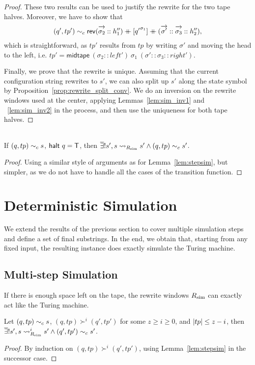 \begin{proof}
  These two results can be used to justify the rewrite for the two tape halves. Moreover, we have to show that 
  \begin{align*}
    (q', tp') \reprc{} \rev{(\polpos{\sigma_2} :: h_1'')} \concat [{q'}^{\sigma_1}] \concat (\polpos{\sigma'} :: \polpos{\sigma_3} :: h_2''), 
  \end{align*}
  which is straightforward, as $tp'$ results from $tp$ by writing $\sigma'$ and moving the head to the left, i.e.
    $tp' = \textsf{midtape}~(\sigma_2 :: left')~\sigma_1~(\sigma' :: \sigma_3 :: right')$.

  Finally, we prove that the rewrite is unique. Assuming that the current configuration string rewrites to $s'$, we can also split up $s'$ along the state symbol by Proposition~\ref{prop:rewrite_split_conv}. We do an inversion on the rewrite windows used at the center, applying Lemmas~\ref{lem:sim_inv1} and ~\ref{lem:sim_inv2} in the process, and then use the uniqueness for both tape halves.
\end{proof}

\begin{lemma}\label{lem:haltsim}~\\
  If $(q, tp) \sim_c{} s$, $\textsf{halt}~q = \mathsf{T}$, then $\overline{\exists}! s', s \rightsquigarrow_{R_{\text{sim}}} s' \land (q, tp) \sim_c{} s'$.
\end{lemma}
\begin{proof}
  Using a similar style of arguments as for Lemma~\ref{lem:stepsim}, but simpler, as we do not have to handle all the cases of the transition function.
\end{proof}

\section{Deterministic Simulation}
We extend the results of the previous section to cover multiple simulation steps and define a set of final substrings. In the end, we obtain that, starting from any fixed input, the resulting \PR{} instance does exactly simulate the Turing machine.

\subsection{Multi-step Simulation}
If there is enough space left on the tape, the rewrite windows $R_{\text{sim}}$ can exactly act like the Turing machine.

\begin{lemma}\label{lem:multistep_complete}
  Let $(q, tp) \sim_c{} s$, $(q, tp) \succ^i (q', tp')$ for some $z \ge i \ge 0$, and $|tp| \le z - i$, then $\overline{\exists}! s', s \rightsquigarrow_{R_{\text{sim}}}^i s' \land (q', tp') \sim_c{} s'$. 
\end{lemma}
\begin{proof}
  By induction on $(q, tp) \succ^i (q', tp')$, using Lemma~\ref{lem:stepsim} in the successor case. 
\end{proof}

